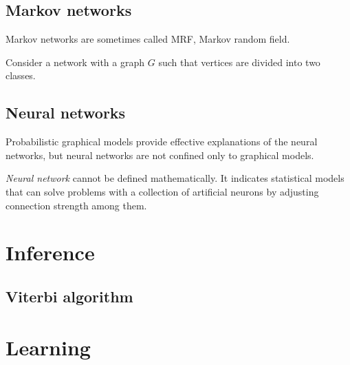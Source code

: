 \documentclass{../exp}
\begin{document}
\begin{ex}
\end{ex}
\begin{ex}
\end{ex}


\subsection{Markov networks}

\begin{defn}
\end{defn}
Markov networks are sometimes called MRF, Markov random field.

\begin{ex}
Consider a network with a graph $G$ such that vertices are divided into two classes.
\end{ex}

\subsection{Neural networks}
Probabilistic graphical models provide effective explanations of the neural networks, but neural networks are not confined only to graphical models.
\begin{defn}
\emph{Neural network} cannot be defined mathematically.
It indicates statistical models that can solve problems with a collection of artificial neurons by adjusting connection strength among them.
\end{defn}

\begin{ex}

\end{ex}

\begin{ex}

\end{ex}

\section{Inference}
\subsection{Viterbi algorithm}
\section{Learning}
\end{document}
